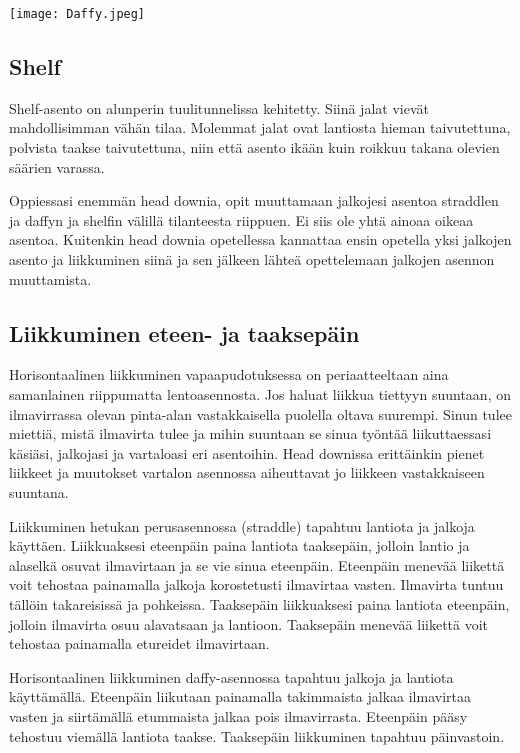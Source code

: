 \begin{Figure}\centering\texttt{[image: Daffy.jpeg]}\end{Figure} 

\subsection{ Shelf }
\label{freefly-lentoasennot-shelf}


Shelf-asento on alunperin tuulitunnelissa kehitetty. Siinä jalat vievät mahdollisimman vähän tilaa. Molemmat jalat ovat lantiosta hieman taivutettuna, polvista taakse taivutettuna, niin että asento ikään kuin roikkuu takana olevien säärien varassa. 


Oppiessasi enemmän head downia, opit muuttamaan jalkojesi asentoa straddlen ja daffyn ja shelfin välillä tilanteesta riippuen. Ei siis ole yhtä ainoaa oikeaa asentoa. Kuitenkin head downia opetellessa kannattaa ensin opetella yksi jalkojen asento ja liikkuminen siinä ja sen jälkeen lähteä opettelemaan jalkojen asennon muuttamista. 

\subsection{ Liikkuminen eteen- ja taaksepäin }
\label{freefly-lentoasennot-liikkuminen-eteen-ja-taaksepain}


Horisontaalinen liikkuminen vapaapudotuksessa on periaatteeltaan aina samanlainen riippumatta lentoasennosta. Jos haluat liikkua tiettyyn suuntaan, on ilmavirrassa olevan pinta-alan vastakkaisella puolella oltava suurempi. Sinun tulee miettiä, mistä ilmavirta tulee ja mihin suuntaan se sinua työntää liikuttaessasi käsiäsi, jalkojasi ja vartaloasi eri asentoihin. Head downissa erittäinkin pienet liikkeet ja muutokset vartalon asennossa aiheuttavat jo liikkeen vastakkaiseen suuntana. 


Liikkuminen hetukan perusasennossa (straddle) tapahtuu lantiota ja jalkoja käyttäen. Liikkuaksesi eteenpäin paina lantiota taaksepäin, jolloin lantio ja alaselkä osuvat ilmavirtaan ja se vie sinua eteenpäin. Eteenpäin menevää liikettä voit tehostaa painamalla jalkoja korostetusti ilmavirtaa vasten. Ilmavirta tuntuu tällöin takareisissä ja pohkeissa. Taaksepäin liikkuaksesi paina lantiota eteenpäin, jolloin ilmavirta osuu alavatsaan ja lantioon. Taaksepäin menevää liikettä voit tehostaa painamalla etureidet ilmavirtaan. 


Horisontaalinen liikkuminen daffy-asennossa tapahtuu jalkoja ja lantiota käyttämällä. Eteenpäin liikutaan painamalla takimmaista jalkaa ilmavirtaa vasten ja siirtämällä etummaista jalkaa pois ilmavirrasta. Eteenpäin pääsy tehostuu viemällä lantiota taakse. Taaksepäin liikkuminen tapahtuu päinvastoin. 


